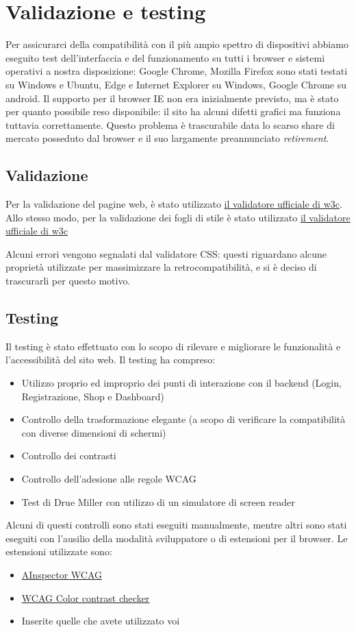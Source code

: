 \section{Validazione e testing}
Per assicurarci della compatibilità con il più ampio spettro di dispositivi abbiamo eseguito test dell'interfaccia e del funzionamento su tutti i browser e sistemi operativi a nostra disposizione: Google Chrome, Mozilla Firefox sono stati testati su Windows e Ubuntu, Edge e Internet Explorer su Windows, Google Chrome su android.
Il supporto per il browser IE non era inizialmente previsto, ma è stato per quanto possibile reso disponibile: il sito ha alcuni difetti grafici ma funziona tuttavia correttamente. Questo problema è trascurabile data lo scarso share di mercato posseduto dal browser e il suo largamente preannunciato \textit{retirement}.


\subsection{Validazione}
Per la validazione del pagine web, è stato utilizzato \href{https://validator.w3.org/}{il validatore ufficiale di w3c}.
Allo stesso modo, per la validazione dei fogli di stile è stato utilizzato \href{https://jigsaw.w3.org/css-validator/}{il validatore ufficiale di w3c}


Alcuni errori vengono segnalati dal validatore CSS: questi riguardano alcune proprietà utilizzate per massimizzare la retrocompatibilità, e si è deciso di trascurarli per questo motivo.

\subsection{Testing}
Il testing è stato effettuato con lo scopo di rilevare e migliorare le funzionalità e l'accessibilità del sito web.
Il testing ha compreso:
\begin{itemize}
    \item Utilizzo proprio ed improprio dei punti di interazione con il backend (Login, Registrazione, Shop e Dashboard)
    \item Controllo della trasformazione elegante (a scopo di verificare la compatibilità con diverse dimensioni di schermi)
    \item Controllo dei contrasti
    \item Controllo dell'adesione alle regole WCAG
    \item Test di Drue Miller con utilizzo di un simulatore di screen reader
\end{itemize}

Alcuni di questi controlli sono stati eseguiti manualmente, mentre altri sono stati eseguiti con l'ausilio della modalità sviluppatore o di estensioni per il browser.
Le estensioni utilizzate sono: \begin{itemize}
    \item \href{https://addons.mozilla.org/en-US/firefox/addon/ainspector-wcag/}{AInspector WCAG}
    \item \href{https://addons.mozilla.org/en-US/firefox/addon/wcag-contrast-checker/}{WCAG Color contrast checker}
    \item Inserite quelle che avete utilizzato voi
\end{itemize}